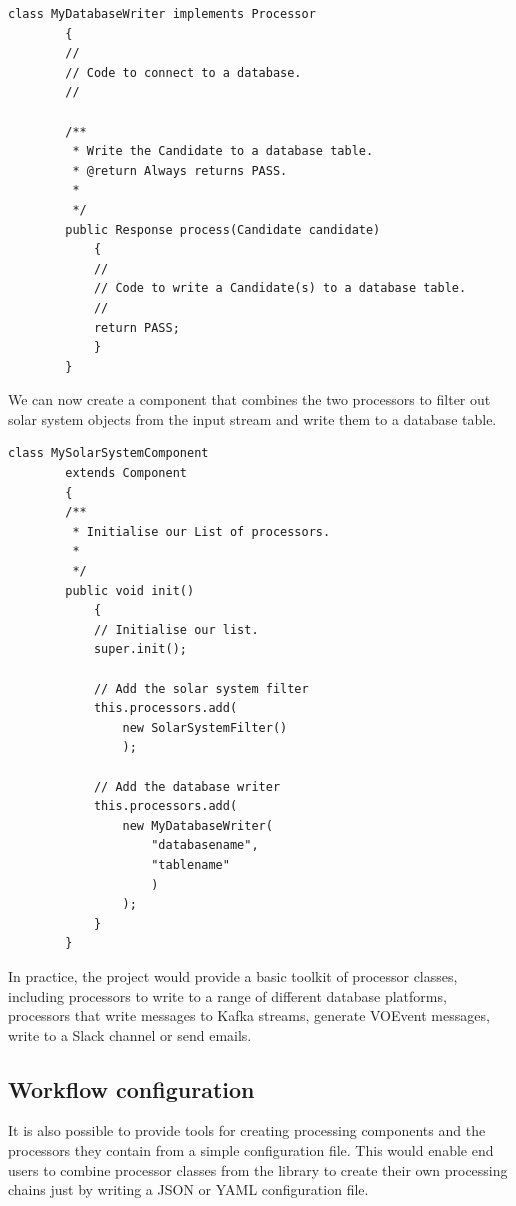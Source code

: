 \documentclass{article}
\newcommand{\json} {JSON\xspace}
\newcommand{\yaml} {YAML\xspace}
\newcommand{\voevent} {VOEvent\xspace}
\newcommand{\kafka} {Kafka\xspace}
\begin{document}
\begin{lstlisting}[style=Java]
    class MyDatabaseWriter implements Processor
        {
        //
        // Code to connect to a database.
        //

        /**
         * Write the Candidate to a database table.
         * @return Always returns PASS.
         *
         */
        public Response process(Candidate candidate)
            {
            //
            // Code to write a Candidate(s) to a database table.
            //
            return PASS;
            }
        }
\end{lstlisting}

We can now create a component that combines the two processors to filter out solar system objects from the input stream and write them to a database table.

\begin{lstlisting}[style=Java]
    class MySolarSystemComponent
        extends Component
        {
        /**
         * Initialise our List of processors.
         *
         */
        public void init()
            {
            // Initialise our list.
            super.init();

            // Add the solar system filter
            this.processors.add(
                new SolarSystemFilter()
                );

            // Add the database writer
            this.processors.add(
                new MyDatabaseWriter(
                    "databasename",
                    "tablename"
                    )
                );
            }
        }
\end{lstlisting}

In practice, the project would provide a basic toolkit of processor classes, including processors to write to a range of different database platforms, processors that write messages to \kafka streams, generate \voevent messages, write to a Slack channel or send emails.

\subsection{Workflow configuration}
\label{workflow-configuration}

It is also possible to provide tools for creating processing components and the processors they contain from a simple configuration file. This would enable end users to combine processor classes from the library to create their own processing chains just by writing a \json or \yaml configuration file.
\end{document}
